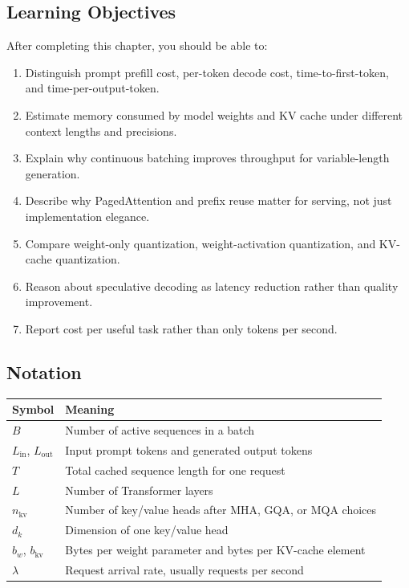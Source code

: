 \subsection*{Learning Objectives}

After completing this chapter, you should be able to:

\begin{enumerate}
  \item Distinguish prompt prefill cost, per-token decode cost, time-to-first-token, and time-per-output-token.
  \item Estimate memory consumed by model weights and KV cache under different context lengths and precisions.
  \item Explain why continuous batching improves throughput for variable-length generation.
  \item Describe why PagedAttention and prefix reuse matter for serving, not just implementation elegance.
  \item Compare weight-only quantization, weight-activation quantization, and KV-cache quantization.
  \item Reason about speculative decoding as latency reduction rather than quality improvement.
  \item Report cost per useful task rather than only tokens per second.
\end{enumerate}

\subsection*{Notation}

\begin{center}
\begin{tabularx}{\textwidth}{@{}lX@{}}
\toprule
Symbol & Meaning \\
\midrule
$B$ & Number of active sequences in a batch \\
$L_{\text{in}}$, $L_{\text{out}}$ & Input prompt tokens and generated output tokens \\
$T$ & Total cached sequence length for one request \\
$L$ & Number of Transformer layers \\
$n_{\text{kv}}$ & Number of key/value heads after MHA, GQA, or MQA choices \\
$d_k$ & Dimension of one key/value head \\
$b_w$, $b_{\text{kv}}$ & Bytes per weight parameter and bytes per KV-cache element \\
$\lambda$ & Request arrival rate, usually requests per second \\
\bottomrule
\end{tabularx}
\end{center}


